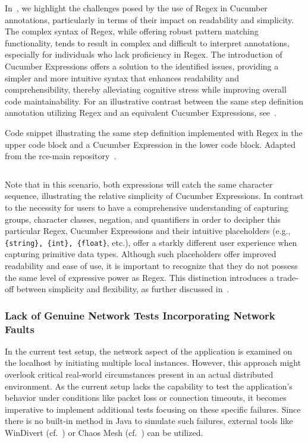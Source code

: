 In~, we highlight the challenges posed by the use of \ac{Regex} in Cucumber annotations, particularly in terms of their impact on readability and simplicity. The complex syntax of \ac{Regex}, while offering robust pattern matching functionality, tends to result in complex and difficult to interpret annotations, especially for individuals who lack proficiency in \ac{Regex}. The introduction of Cucumber Expressions offers a solution to the identified issues, providing a simpler and more intuitive syntax that enhances readability and comprehensibility, thereby alleviating cognitive stress while improving overall code maintainability. For an illustrative contrast between the same step definition annotation utilizing \ac{Regex} and an equivalent Cucumber Expressions, see~.

\begin{listing}[!ht]
\caption{Code snippet illustrating the same step definition implemented with \ac{Regex} in the upper code block and a Cucumber Expression in the lower code block. Adapted from the rce-main repository~\cite{githubGitHubRcenvironmentrcemain}.}
\label{lst:simpleRegex}
\inputminted{java}{files/code/simpleRegex.java}
\end{listing}

Note that in this scenario, both expressions will catch the same character sequence, illustrating the relative simplicity of Cucumber Expressions. In contrast to the necessity for users to have a comprehensive understanding of capturing groups, character classes, negation, and quantifiers in order to decipher this particular \ac{Regex}, Cucumber Expressions and their intuitive placeholders (e.g., \verb|{string}, {int}, {float}|, etc.), offer a starkly different user experience when capturing primitive data types. Although such placeholders offer improved readability and ease of use, it is important to recognize that they do not possess the same level of expressive power as \ac{Regex}. This distinction introduces a trade-off between simplicity and flexibility, as further discussed in~. 


\subsubsection{Lack of Genuine Network Tests Incorporating Network Faults}
\label{sub:lack-network-tests}

In the current test setup, the network aspect of the application is examined on the localhost by initiating multiple local instances. However, this approach might overlook critical real-world circumstances present in an actual distributed environment. As the current setup lacks the capability to test the application's behavior under conditions like packet loss or connection timeouts, it becomes imperative to implement additional tests focusing on these specific failures. Since there is no built-in method in Java to simulate such failures, external tools like WinDivert (cf.~) or Chaos Mesh (cf.~) can be utilized.

